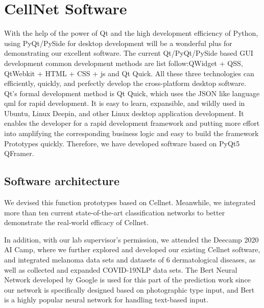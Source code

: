 {\section{CellNet Software}
\label{sec:ipsum}
With the help of the power of Qt and the high development efficiency of Python, using PyQt/PySide for desktop development will be a wonderful plus for demonstrating our excellent software.
The current Qt/PyQt/PySide based GUI development common development methods are list follow:QWidget + QSS, QtWebkit + HTML + CSS + js and Qt Quick. All these three technologies can efficiently, quickly, and perfectly develop the cross-platform desktop software. Qt's formal development method is Qt Quick, which uses the JSON like language qml for rapid development. It is easy to learn, expansible, and wildly used in  Ubuntu, Linux Deepin, and other Linux desktop application development. It enables the developer for a rapid development framework and putting more effort into amplifying the corresponding business logic and easy to build the framework Prototypes quickly. Therefore, we have developed software based on PyQt5 QFramer.

\subsection{Software architecture} %
\label{sub:dolor_sit}
We devised this function prototypes based on Cellnet. Meanwhile, we integrated more than ten current state-of-the-art classification networks to better demonstrate the real-world efficacy of Cellnet.

In addition, with our lab supervisor's permission, we attended the Deecamp 2020 AI Camp, where we further explored and developed our existing Cellnet software, and integrated melanoma data sets and datasets of 6 dermatological diseases, as well as collected and expanded COVID-19NLP data sets. The Bert Neural Network developed by Google is used for this part of the prediction work since our network is specifically designed based on photographic type input, and Bert is a highly popular neural network for handling text-based input.

}
